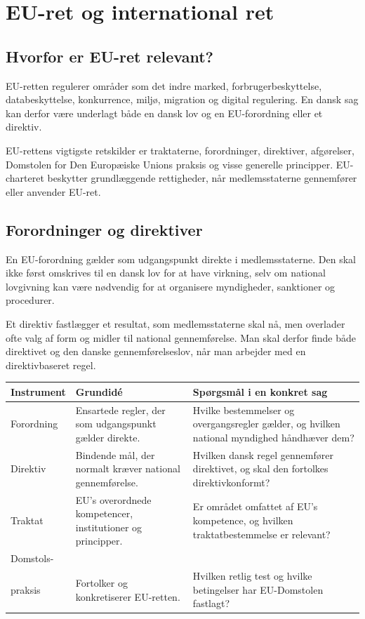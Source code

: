 \chapter{EU-ret og international ret}


\section{Hvorfor er EU-ret relevant?}

EU-retten regulerer områder som det indre marked, forbrugerbeskyttelse, databeskyttelse, konkurrence, miljø, migration og digital regulering. En dansk sag kan derfor være underlagt både en dansk lov og en EU-forordning eller et direktiv.

EU-rettens vigtigste retskilder er traktaterne, forordninger, direktiver, afgørelser, Domstolen for Den Europæiske Unions praksis og visse generelle principper. EU-charteret beskytter grundlæggende rettigheder, når medlemsstaterne gennemfører eller anvender EU-ret.

\section{Forordninger og direktiver}

En EU-forordning gælder som udgangspunkt direkte i medlemsstaterne. Den skal ikke først omskrives til en dansk lov for at have virkning, selv om national lovgivning kan være nødvendig for at organisere myndigheder, sanktioner og procedurer.

Et direktiv fastlægger et resultat, som medlemsstaterne skal nå, men overlader ofte valg af form og midler til national gennemførelse. Man skal derfor finde både direktivet og den danske gennemførelseslov, når man arbejder med en direktivbaseret regel.

\begin{tabularx}{\textwidth}{@{}>{\RaggedRight\arraybackslash}p{2.7cm}X X@{}}
\toprule
\textbf{Instrument} & \textbf{Grundidé} & \textbf{Spørgsmål i en konkret sag} \\
\midrule
Forordning & Ensartede regler, der som udgangspunkt gælder direkte. & Hvilke bestemmelser og overgangsregler gælder, og hvilken national myndighed håndhæver dem? \\
Direktiv & Bindende mål, der normalt kræver national gennemførelse. & Hvilken dansk regel gennemfører direktivet, og skal den fortolkes direktivkonformt? \\
Traktat & EU's overordnede kompetencer, institutioner og principper. & Er området omfattet af EU's kompetence, og hvilken traktatbestemmelse er relevant? \\
Domstols-\\praksis & Fortolker og konkretiserer EU-retten. & Hvilken retlig test og hvilke betingelser har EU-Domstolen fastlagt? \\
\bottomrule
\end{tabularx}

